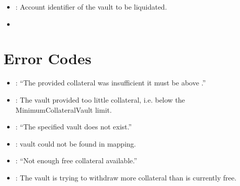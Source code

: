 \documentclass[a4paper,10pt,english]{sphinxmanual}
\begin{document}


\begin{itemize}
\item {} 
: Account identifier of the vault to be liquidated.

\end{itemize}

\begin{itemize}
\item {} 
{\hyperref[\detokenize{spec/vault-registry:liquidatevault}]{}}

\end{itemize}


\section{Error Codes}
\label{\detokenize{spec/vault-registry:error-codes}}
\begin{itemize}
\item {} 
: “The provided collateral was insufficient \sphinxhyphen{} it must be above .”

\item {} 
: The vault provided too little collateral, i.e. below the MinimumCollateralVault limit.

\end{itemize}

\begin{itemize}
\item {} 
: “The specified vault does not exist.”

\item {} 
: vault could not be found in  mapping.

\end{itemize}

\begin{itemize}
\item {} 
: “Not enough free collateral available.”

\item {} 
: The vault is trying to withdraw more collateral than is currently free.

\end{itemize}
\end{document}
